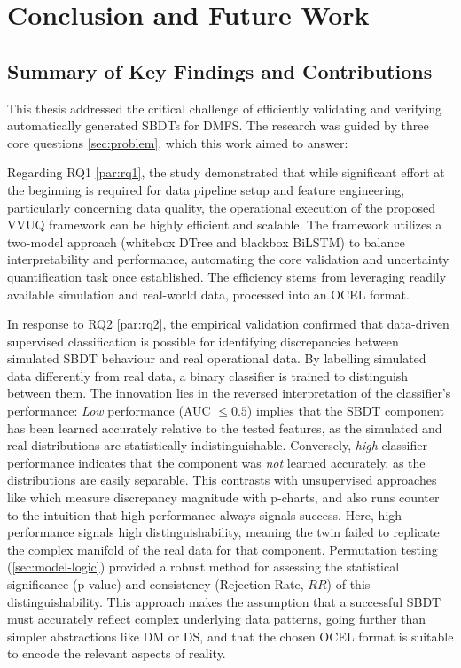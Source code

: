 \chapter{Conclusion and Future Work}
\label{chap:conclusion}

\section{Summary of Key Findings and Contributions}
\label{sec:conclusion_summary_findings}

This thesis addressed the critical challenge of efficiently validating and verifying automatically generated SBDTs for DMFS. The research was guided by three core questions \autoref{sec:problem}, which this work aimed to answer:

Regarding RQ1 \autoref{par:rq1}, the study demonstrated that while significant effort at the beginning is required for data pipeline setup and feature engineering, particularly concerning data quality, the operational execution of the proposed VVUQ framework can be highly efficient and scalable. The framework utilizes a two-model approach (whitebox DTree and blackbox BiLSTM) to balance interpretability and performance, automating the core validation and uncertainty quantification task once established. The efficiency stems from leveraging readily available simulation and real-world data, processed into an OCEL format.

In response to RQ2 \autoref{par:rq2}, the empirical validation confirmed that data-driven supervised classification is possible for identifying discrepancies between simulated SBDT behaviour and real operational data. By labelling simulated data differently from real data, a binary classifier is trained to distinguish between them. The innovation lies in the reversed interpretation of the classifier's performance: \textit{Low} performance (AUC $\le 0.5$) implies that the SBDT component has been learned accurately relative to the tested features, as the simulated and real distributions are statistically indistinguishable. Conversely, \textit{high} classifier performance indicates that the component was \textit{not} learned accurately, as the distributions are easily separable. This contrasts with unsupervised approaches like \textcite{dos2024digital} which measure discrepancy magnitude with p-charts, and also runs counter to the intuition that high performance always signals success. Here, high performance signals high distinguishability, meaning the twin failed to replicate the complex manifold of the real data for that component. Permutation testing (\autoref{sec:model-logic}) provided a robust method for assessing the statistical significance (p-value) and consistency (Rejection Rate, $RR$) of this distinguishability. This approach makes the assumption that a successful SBDT must accurately reflect complex underlying data patterns, going further than simpler abstractions like DM or DS, and that the chosen OCEL format is suitable to encode the relevant aspects of reality.

